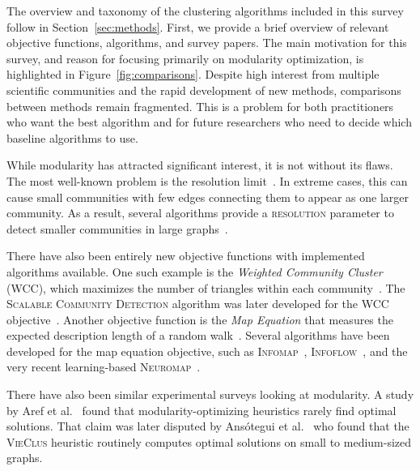 \documentclass[../paper.tex]{subfiles}
\begin{document}


The overview and taxonomy of the clustering algorithms included in this survey follow in Section~\ref{sec:methods}. First, we provide a brief overview of relevant objective functions, algorithms, and survey papers. The main motivation for this survey, and reason for focusing primarily on modularity optimization, is highlighted in Figure~\ref{fig:comparisons}. Despite high interest from multiple scientific communities and the rapid development of new methods, comparisons between methods remain fragmented. This is a problem for both practitioners who want the best algorithm and for future researchers who need to decide which baseline algorithms to use.

While modularity has attracted significant interest, it is not without its flaws. The most well-known problem is the resolution limit~\cite{resolution2007}. In extreme cases, this can cause small communities with few edges connecting them to appear as one larger community. As a result, several algorithms provide a \textsc{resolution} parameter to detect smaller communities in large graphs~\cite{louvain2008, leiden2019}.

There have also been entirely new objective functions with implemented algorithms available. One such example is the \textit{Weighted Community Cluster} (WCC), which maximizes the number of triangles within each community~\cite{wcc2012}. The \textsc{Scalable Community Detection} algorithm was later developed for the WCC objective~\cite{scd2014}. Another objective function is the \textit{Map Equation} that measures the expected description length of a random walk~\cite{infomap2008}. Several algorithms have been developed for the map equation objective, such as \textsc{Infomap}~\cite{infomap2008}, \textsc{Infoflow}~\cite{infoflow2019}, and the very recent learning-based \textsc{Neuromap}~\cite{neuromap2024}.

There have also been similar experimental surveys looking at modularity. A study by Aref et al.~\cite{survey2023} found that modularity-optimizing heuristics rarely find optimal solutions. That claim was later disputed by Ans{\'o}tegui et al.~\cite{maxsat2025} who found that the \textsc{VieClus} heuristic routinely computes optimal solutions on small to medium-sized graphs.


\ifSubfilesClassLoaded{%
}{}
\end{document}
